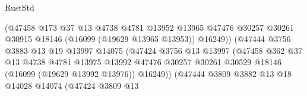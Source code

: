 \begin{lexlean}{RustStd}
\begin{coremodule}
                                          (@47458
                                            @173
                                            @37
                                            @13
                                            @4738
                                            @4781
                                            @13952
                                            @13965
                                            @47476
                                            @30257
                                            @30261
                                            @30915
                                            @18146
                                            (@16099 (@19629 @13965 @13953))
                                            @16249))
                                        (@47444
                                          @3756
                                          @3883
                                          @13
                                          @19
                                          @13997
                                          @14075
                                          (@47424
                                            @3756
                                            @13
                                            @13997
                                            (@47458
                                              @362
                                              @37
                                              @13
                                              @4738
                                              @4781
                                              @13975
                                              @13992
                                              @47476
                                              @30257
                                              @30261
                                              @30529
                                              @18146
                                              (@16099 (@19629 @13992 @13976))
                                              @16249))
                                          (@47444
                                            @3809
                                            @3882
                                            @13
                                            @18
                                            @14028
                                            @14074
                                            (@47424
                                              @3809
                                              @13

\end{coremodule}
\end{lexlean}
